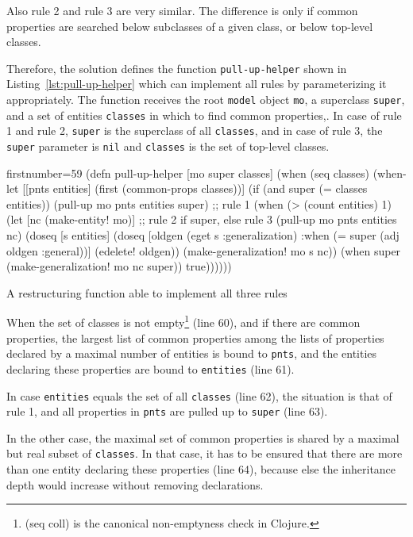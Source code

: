 \documentclass[11pt]{article}
\begin{document}
Also rule 2 and rule 3 are very similar.  The difference is only if common
properties are searched below subclasses of a given class, or below top-level
classes.

Therefore, the solution defines the function \verb|pull-up-helper| shown in
Listing~\ref{lst:pull-up-helper} which can implement all rules by
parameterizing it appropriately.  The function receives the root \verb|model|
object \verb|mo|, a superclass \verb|super|, and a set of entities
\verb|classes| in which to find common properties,.  In case of rule 1 and rule
2, \verb|super| is the superclass of all \verb|classes|, and in case of rule 3,
the \verb|super| parameter is \verb|nil| and \verb|classes| is the set of
top-level classes.

\begin{listing}[htbp]
  \begin{clojurecode*}{firstnumber=59}
(defn pull-up-helper [mo super classes]
  (when (seq classes)
    (when-let [[pnts entities] (first (common-props classes))]
      (if (and super (= classes entities))
        (pull-up mo pnts entities super)  ;; rule 1
        (when (> (count entities) 1)
          (let [nc (make-entity! mo)]     ;; rule 2 if super, else rule 3
            (pull-up mo pnts entities nc)
            (doseq [s entities]
              (doseq [oldgen (eget s :generalization)
                      :when (= super (adj oldgen :general))]
                (edelete! oldgen))
              (make-generalization! mo s nc))
            (when super (make-generalization! mo nc super))
            true))))))
  \end{clojurecode*}
  \caption{A restructuring function able to implement all three rules}
  \label{lst:pull-up-helper}
\end{listing}

When the set of classes is not empty\footnote{\textsf{(seq coll)} is the
  canonical non-emptyness check in Clojure.} (line 60), and if there are common
properties, the largest list of common properties among the lists of properties
declared by a maximal number of entities is bound to \verb|pnts|, and the
entities declaring these properties are bound to \verb|entities| (line 61).

In case \verb|entities| equals the set of all \verb|classes| (line 62), the
situation is that of rule 1, and all properties in \verb|pnts| are pulled up to
\verb|super| (line 63).

In the other case, the maximal set of common properties is shared by a maximal
but real subset of \verb|classes|.  In that case, it has to be ensured that
there are more than one entity declaring these properties (line 64), because
else the inheritance depth would increase without removing declarations.
\end{document}
